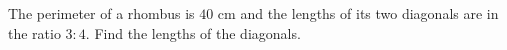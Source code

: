 The perimeter of a rhombus is $40$ cm and the lengths of its two diagonals are in the ratio $3:4$. Find the lengths of the diagonals.
